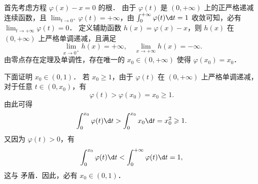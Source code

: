 \begin{myproof}
    首先考虑方程 $\varphi(x) - x = 0$ 的根．
    由于 $\varphi(t)$ 是 $(0, +\infty)$ 上的正严格递减连续函数，且 $\lim_{t\to0^+} \varphi(t) = +\infty$，由 $\int_0^{+\infty} \varphi(t) \d t = 1$ 收敛可知，必有 $\lim_{t\to+\infty} \varphi(t) = 0$．
    定义辅助函数 $h(x) = \varphi(x) - x$，则 $h(x)$ 在 $(0, +\infty)$ 上严格单调递减，且满足
    \begin{equation}\label{eq:q14-limit-2}
        \lim_{x\to0^+} h(x) = +\infty, \quad \lim_{x\to+\infty} h(x) = -\infty.
    \end{equation}
    由零点存在定理及单调性，存在唯一的 $x_0 \in (0, +\infty)$ 使得 $\varphi(x_0) = x_0$．

    下面证明 $x_0 \in (0, 1)$．
    若 $x_0 \geqslant 1$，由于 $\varphi(t)$ 在 $(0, +\infty)$ 上严格单调递减，对于任意 $t \in (0, x_0)$，有
    \begin{equation}\label{eq:q14-ineq-3}
        \varphi(t) > \varphi(x_0) = x_0 \geqslant 1.
    \end{equation}
    由此可得
    \begin{equation}\label{eq:q14-integral-lower-4}
        \int_0^{x_0} \varphi(t) \d t > \int_0^{x_0} x_0 \d t = x_0^2 \geqslant 1.
    \end{equation}
    又因为 $\varphi(t) > 0$，有
    \begin{equation}\label{eq:q14-integral-upper-5}
        \int_0^{x_0} \varphi(t) \d t < \int_0^{+\infty} \varphi(t) \d t = 1,
    \end{equation}
    这与  矛盾．因此，必有 $x_0 \in (0, 1)$．


\end{myproof}
